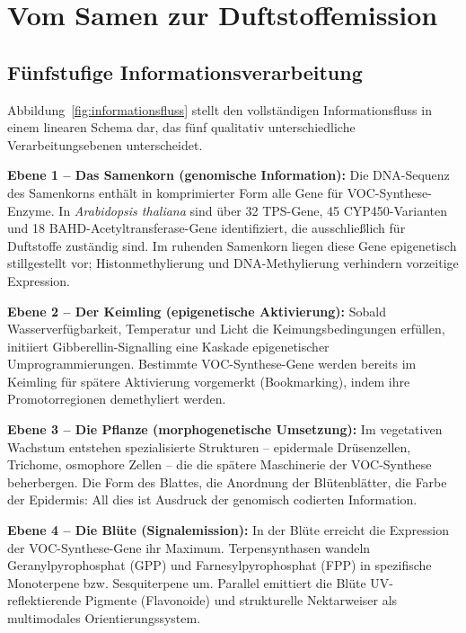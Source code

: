 ﻿\documentclass[12pt,a4paper]{article}
\begin{document}
\section{Vom Samen zur Duftstoffemission}

\subsection{F\"unfstufige Informationsverarbeitung}

Abbildung~\ref{fig:informationsfluss} stellt den vollst\"andigen Informationsfluss in einem linearen Schema dar, das f\"unf qualitativ unterschiedliche Verarbeitungsebenen unterscheidet.

\textbf{Ebene 1 -- Das Samenkorn (genomische Information):} Die DNA-Sequenz des Samenkorns enth\"alt in komprimierter Form alle Gene f\"ur VOC-Synthese-Enzyme. In \textit{Arabidopsis thaliana} sind \"uber 32 TPS-Gene, 45 CYP450-Varianten und 18 BAHD-Acetyltransferase-Gene identifiziert, die ausschlie{\ss}lich f\"ur Duftstoffe zust\"andig sind. Im ruhenden Samenkorn liegen diese Gene epigenetisch stillgestellt vor; Histonmethylierung und DNA-Methylierung verhindern vorzeitige Expression.

\textbf{Ebene 2 -- Der Keimling (epigenetische Aktivierung):} Sobald Wasserverf\"ugbarkeit, Temperatur und Licht die Keimungsbedingungen erf\"ullen, initiiert Gibberellin-Signalling eine Kaskade epigenetischer Umprogrammierungen. Bestimmte VOC-Synthese-Gene werden bereits im Keimling f\"ur sp\"atere Aktivierung vorgemerkt (Bookmarking), indem ihre Promotorregionen demethyliert werden.

\textbf{Ebene 3 -- Die Pflanze (morphogenetische Umsetzung):} Im vegetativen Wachstum entstehen spezialisierte Strukturen -- epidermale Dr\"usenzellen, Trichome, osmophore Zellen -- die die sp\"atere Maschinerie der VOC-Synthese beherbergen. Die Form des Blattes, die Anordnung der Bl\"utenbl\"atter, die Farbe der Epidermis: All dies ist Ausdruck der genomisch codierten Information.

\textbf{Ebene 4 -- Die Bl\"ute (Signalemission):} In der Bl\"ute erreicht die Expression der VOC-Synthese-Gene ihr Maximum. Terpensynthasen wandeln Geranylpyrophosphat (GPP) und Farnesylpyrophosphat (FPP) in spezifische Monoterpene bzw. Sesquiterpene um. Parallel emittiert die Bl\"ute UV-reflektierende Pigmente (Flavonoide) und strukturelle Nektarweiser als multimodales Orientierungssystem.
\end{document}

